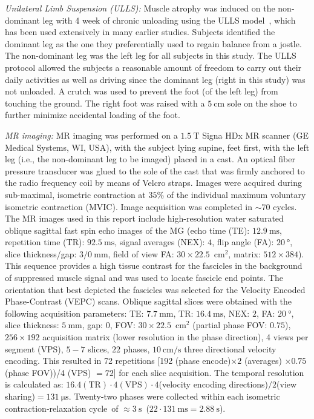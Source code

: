 \textit{Unilateral Limb Suspension (ULLS):}
Muscle atrophy was induced on the non-dominant leg with 4 week of chronic unloading using the ULLS model~\cite{RNS19}, which has been used extensively in many earlier studies.
Subjects identified the dominant leg as the one they preferentially used to regain balance from a jostle. 
The non-dominant leg was the left leg for all subjects in this study. 
The ULLS protocol allowed the subjects a reasonable amount of freedom to carry out their daily activities as well as driving since the dominant leg (right in this study) was not unloaded. 
A crutch was used to prevent the foot (of the left leg) from touching the ground. 
The right foot was raised with a $\SI{5}{\centi\meter}$ sole on the shoe to further minimize accidental loading of the foot.

\textit{MR imaging:}
MR imaging was performed on a $\SI{1.5}{\tesla}$ Signa HDx MR scanner (GE Medical Systems, WI, USA), with the subject lying supine, feet first, with the left leg (i.e., the non-dominant leg to be imaged) placed in a cast.
An optical fiber pressure transducer was glued to the sole of the cast that was firmly anchored to the radio frequency coil by means of Velcro straps.
Images were acquired during sub-maximal, isometric contraction at $35\%$ of the individual maximum voluntary isometric contraction (MVIC). 
Image acquisition was completed in $\sim 70$ cycles.
The MR images used in this report include high-resolution water saturated oblique sagittal fast spin echo images of the MG (echo time (TE): $\SI{12.9}{\milli\second}$, repetition time (TR): $\SI{92.5}{\milli\second}$, signal averages (NEX): $4$, flip angle (FA): $\SI{20}{\degree}$, slice thickness/gap: $3/\SI{0}{\milli\meter}$, field of view {FA}: $30 \times 22.5 \; \SI{}{\centi\meter^2}$, matrix: $512 \times 384$). 
This sequence provides a high tissue contrast for the fascicles in the background of suppressed muscle signal and was used to locate fascicle end points. 
The orientation that best depicted the fascicles was selected for the Velocity Encoded Phase-Contrast (VEPC) scans. 
Oblique sagittal slices were obtained with the following acquisition parameters: TE: $\SI{7.7}{\milli\meter}$, TR: $\SI{16.4}{\milli\second}$, NEX: $2$, FA: $\SI{20}{\degree}$, slice thickness: $\SI{5}{\milli\meter}$, gap: 0, FOV: $30 \times 22.5 \; \SI{}{\centi\meter^2}$ (partial phase FOV: $0.75$), $256 \times 192$ acquisition matrix (lower resolution in the phase direction), 4 views per segment (VPS), $5-7$ slices, $22$ phases, $\SI{10}{\centi\meter/\second}$ three directional velocity encoding. 
This resulted in 72 repetitions [192 (phase encode)$ \times 2$ (averages) $\times 0.75$ (phase FOV))/4 (VPS) $= 72$] for each slice acquisition. 
The temporal resolution is calculated as: $16.4(\mathrm{TR})\cdot 4(\mathrm{VPS})\cdot 4$(velocity encoding directions)$/2$(view sharing)$= \SI{131}{\micro\second}$. 
Twenty-two phases were collected within each isometric contraction-relaxation cycle~of $\approx\SI{3}{\second}$~($22\cdot \SI{131}{\milli\second} = \SI{2.88}{\second}$). 

